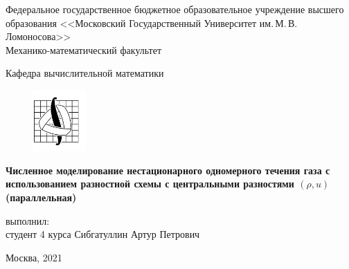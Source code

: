 \begin{titlepage}
	\begin{center}

		Федеральное государственное бюджетное образовательное учреждение высшего образования 
		<<Московский Государственный Университет им.\,М.\,В.\,Ломоносова>>\\
		
		Механико-математический факультет
		
		Кафедра вычислительной математики\\[0.6cm]
		
		\begin{figure}[!htp]
				\begin{center}
						{\includegraphics[width=20mm]{pics/mmlogo.png}}
					\end{center}
			\end{figure}
		
		\vspace{3cm}
			
		{\bf Численное моделирование нестационарного одномерного течения газа с использованием разностной схемы с центральными разностями $(\rho, u)$ (параллельная)}
		
		\vspace{5cm}
		\begin{flushright}
			{ выполнил:}\\
			студент 4 курса Сибгатуллин Артур Петрович\\[0.5cm]
		\end{flushright}
		\vspace{1cm}
		
		\normalsize Москва, 2021
	\end{center}
\end{titlepage}
